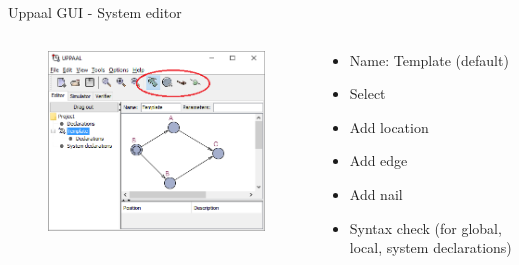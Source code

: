 \documentclass{beamer}
\begin{document}
\begin{frame}{Uppaal GUI - System editor}
	\vspace{-10mm}
	\begin{columns}
		\begin{column}{0.8\textwidth}
			\begin{figure}[H]
				\includegraphics[scale=0.7]{img/uppaal_gui_small_editor_control.png}
			\end{figure}
		\end{column}
		
		\begin{column}{0.3\textwidth}
			\begin{itemize}
				\item Name: Template (default)
				\item Select
				\item Add location
				\item Add edge
				\item Add nail
				\item Syntax check (for global, local, system declarations)
			\end{itemize}
		\end{column}
	\end{columns}		
\end{frame}
\end{document}
